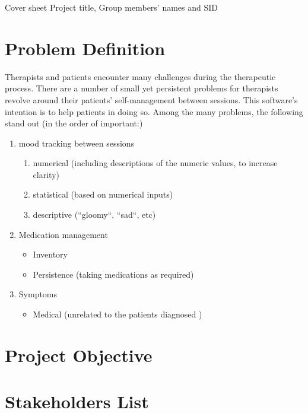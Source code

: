 \documentclass[11pt]{article}
\begin{document}
    \maketitle
    Cover sheet {Project title, Group members' names and SID}


    \chapter{Problem Definition}\label{ch:problem-definition}
    Therapists and patients encounter many challenges during the therapeutic process.
    There are a number of small yet persistent problems for therapists revolve around their patients' self-management between sessions.
    This software's intention is to help patients in doing so.
    Among the many problems, the following stand out (in the order of important:)
    \begin{enumerate}
        \item mood tracking between sessions
        \begin{enumerate}
            \item numerical (including descriptions of the numeric values, to increase clarity)
            \item statistical (based on numerical inputs)
            \item descriptive (``gloomy``, ``sad``, etc)
        \end{enumerate}
        \item Medication management
        \begin{itemize}
            \item Inventory
            \item Persistence (taking medications as required)
        \end{itemize}
        \item Symptoms
        \begin{itemize}
            \item Medical (unrelated to the patients diagnosed )
        \end{itemize}
    \end{enumerate}


    \chapter{Project Objective}\label{ch:project-objective}


    \chapter{Stakeholders List}\label{ch:stakeholders-list}
\end{document}
